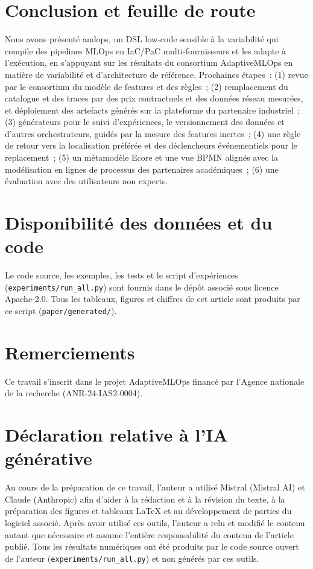 \documentclass[10pt,a4paper]{article}
\newcommand{\tool}{\textsf{amlops}}
\begin{document}
\section{Conclusion et feuille de route}
Nous avons présenté \tool, un DSL low-code sensible à la variabilité qui compile des
pipelines MLOps en IaC/PaC multi-fournisseurs et les adapte à l'exécution, en
s'appuyant sur les résultats du consortium AdaptiveMLOps en matière de variabilité et
d'architecture de référence. Prochaines étapes~: (1) revue par le consortium du modèle
de features et des règles~; (2) remplacement du catalogue et des traces par des prix
contractuels et des données réseau mesurées, et déploiement des artefacts générés sur
la plateforme du partenaire industriel~; (3) générateurs pour le suivi d'expériences,
le versionnement des données et d'autres orchestrateurs, guidés par la mesure des
features inertes~; (4) une règle de retour vers la localisation préférée et des
déclencheurs événementiels pour le replacement~; (5) un métamodèle Ecore et une vue
BPMN alignés avec la modélisation en lignes de processus des partenaires
académiques~; (6) une évaluation avec des utilisateurs non experts.

\section*{Disponibilité des données et du code}\label{sec:dispo}
Le code source, les exemples, les tests et le script d'expériences
(\texttt{experiments/run\_all.py}) sont fournis dans le dépôt associé sous licence
Apache-2.0. Tous les tableaux, figures et chiffres de cet article sont produits par ce
script (\texttt{paper/generated/}).

\section*{Remerciements}
Ce travail s'inscrit dans le projet AdaptiveMLOps financé par l'Agence nationale de la
recherche (ANR-24-IAS2-0004).

\section*{Déclaration relative à l'IA générative}
Au cours de la préparation de ce travail, l'auteur a utilisé Mistral (Mistral AI) et Claude (Anthropic) afin d'aider à la rédaction et à la révision du texte, à la préparation des figures et tableaux \LaTeX{} et au développement de parties du logiciel associé. Après avoir utilisé ces outils, l'auteur a relu et modifié le contenu autant que nécessaire et assume l'entière responsabilité du contenu de l'article publié. Tous les résultats numériques ont été produits par le code source ouvert de l'auteur (\texttt{experiments/run\_all.py}) et non générés par ces outils.
\end{document}
